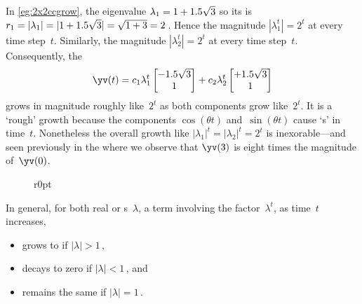 \begin{itemize}
In \cref{eg:2x2ccgrow}, the eigenvalue \(\lambda_1=1+1.5\sqrt3\) so its  is \(r_1=|\lambda_1|=|1+1.5\sqrt3|=\sqrt{1+3}=2\)\,.
Hence the magnitude \(|\lambda_1^t|=2^t\) at every time step~\(t\).
Similarly, the magnitude \(|\lambda_2^t|=2^t\) at every time step~\(t\).
Consequently, the 
\begin{equation*}
\yv(t)=c_1\lambda_1^t\begin{bmatrix} -\i\sqrt3\\1 \end{bmatrix}
+c_2\lambda_2^t\begin{bmatrix} +\i\sqrt3\\1 \end{bmatrix}
\end{equation*}
grows in magnitude roughly like~\(2^t\) as both components grow like~\(2^t\).
It is a `rough' growth because the components \(\cos(\theta t)\) and~\(\sin(\theta t)\)  cause `s' in time~\(t\).
Nonetheless the overall growth like \(|\lambda_1|^t=|\lambda_2|^t=2^t\) is inexorable---and seen previously in the  where we observe that \(\yv(3)\) is eight times the magnitude of~\(\yv(0)\).
\end{itemize}

\begin{figure}[5]r{0pt}
\end{figure}
In general, for both real or s~\(\lambda\), a term involving the factor~\(\lambda^t\), as time~\(t\) increases,
\begin{itemize}
\item grows to  if \(|\lambda|>1\)\,,
\item decays to zero if \(|\lambda|<1\)\,, and
\item remains the same  if \(|\lambda|=1\)\,.
\vspace{1\baselineskip}
\end{itemize}




